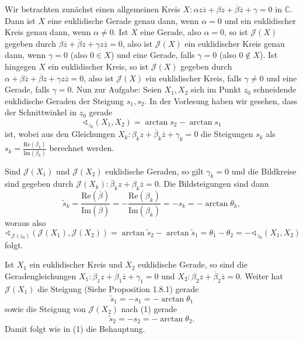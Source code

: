 \documentclass[11pt]{book}
\numberwithin{dummy}{section}
\theoremstyle{nonumberbreak}
\newenvironment{prob}[1][]{\ifthenelse{\equal{#1}{}}{\problem}{\problem[#1]}\rm}{\endproblem}
\newenvironment{sol}[1][]{\ifthenelse{\equal{#1}{}}{\solution}{\solution[#1]}\rm}{\endsolution}
\newcommand{\C}{\mathbb{C}}
\begin{document}
\begin{spacing}{1.4}
\begin{prob}
\begin{sol}


\begin{compactenum}

\item Wir betrachten zunächst einen allgemeinen Kreis $X: \alpha z \overline{z} + \beta z + \overline{\beta}\overline{z} + \gamma=0$ in $\C$. Dann ist $X$ eine euklidische Gerade genau dann, wenn $\alpha=0$ und ein euklidischer Kreis genau dann, wenn $\alpha \neq0$. Ist $X$ eine Gerade, also $\alpha=0$, so ist $\mathcal{J}(X)$ gegeben durch $\beta \overline{z} + \overline{\beta}z + \gamma z \overline{z}=0$, also ist $\mathcal{J}(X)$ ein euklidischer Kreis genau dann, wenn $\gamma=0$ (also $0 \in X$) und eine Gerade, falls $\gamma=0$ (also $0\notin X$). Ist hingegen $X$ ein euklidischer Kreis, so ist $\mathcal{J}(X)$ gegeben durch $\alpha + \beta \overline{z} + \overline{\beta} z + \gamma z\overline{z} =0$, also ist $\mathcal{J}(X)$ ein euklidischer Kreis, falls $\gamma \neq 0$ und eine Gerade, falls $\gamma=0$. Nun zur Aufgabe: Seien $X_1,X_2$ sich im Punkt $z_0$ schneidende euklidische Geraden der Steigung $s_1,s_2$. In der Vorlesung haben wir gesehen, dass der Schnittwinkel in $z_0$ gerade 
$$\sphericalangle_{z_0}(X_1,X_2) = \arctan s_2 - \arctan s_1$$
ist, wobei aus den Gleichungen $X_k: \beta_k z + \overline{\beta}_k \overline{z} + \gamma_k=0$ die Steigungen $s_k$ als $s_k= \frac{\mathrm{Re}(\beta_k)}{\mathrm{Im}(\beta_k)}$ berechnet werden.
\begin{compactenum}
\item Sind $\mathcal{J}(X_1)$ und $\mathcal{J}(X_2)$ euklidische Geraden, so gilt $\gamma_k=0$ und die Bildkreise sind gegeben durch $\mathcal{J}(X_k): \overline{\beta}_k z + \beta_k \overline{z} =0$. Die Bildsteigungen sind dann
$$\tilde{s}_k=\frac{\mathrm{Re}(\overline{\beta})}{\mathrm{Im}(\overline{\beta})} = - \frac{\mathrm{Re}(\beta_k)}{\mathrm{Im}(\beta_k)} = - s_k = - \arctan \theta_k,$$
woraus also 
$$\sphericalangle_{\mathcal{J}(z_0)}(\mathcal{J}(X_1), \mathcal{J}(X_2)) = \arctan \tilde{s}_2 - \arctan \tilde{s}_1 = \theta_1 - \theta_2 = - \sphericalangle_{z_0}(X_1,X_2)$$
folgt.
\item Ist $X_1$ ein euklidischer Kreis und $X_2$ euklidische Gerade, so sind die Geradengleichungen $X_1: \beta_1 z + \overline{\beta}_1 \overline{z} + \gamma_1=0$ und $X_2: \beta_2 z + \overline{\beta}_2 \overline{z} =0$. Weiter hat $\mathcal{J}(X_1)$ die Steigung (Siehe Proposition 1.8.1) gerade
$$\tilde{s}_1=-s_1 = -\arctan \theta_1$$
sowie die Steigung von $\mathcal{J}(X_2)$ nach (1) gerade
$$\tilde{s}_2=-s_2= - \arctan \theta_2.$$
Damit folgt wie in (1) die Behauptung.
\end{compactenum}


\end{compactenum}
\end{sol}
\end{prob}
\end{spacing}
\end{document}
